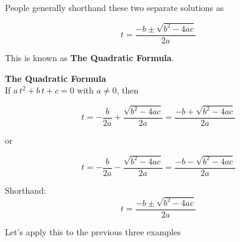 \documentclass{ximera}
\begin{document}
People generally shorthand these two separate solutions as



\[ t  =   \frac{-b \pm \sqrt{b^2 - 4 a c}}{2a}      \]


This is known as \textbf{The Quadratic Formula}.




\begin{definition} \textbf{\textcolor{green!50!black}{The Quadratic Formula}} \\



If $a \, t^2 + b \, t + c = 0$ with $a \ne 0$, then


\[ t   = - \frac{b}{2 a} + \frac{\sqrt{b^2 - 4 a c}}{2a}  = \frac{-b + \sqrt{b^2 - 4 a c}}{2a}      \]

or

\[ t  = - \frac{b}{2 a}  -\frac{\sqrt{b^2 - 4 a c}}{2a} =    \frac{-b - \sqrt{b^2 - 4 a c}}{2a}      \]



Shorthand: 
\[ t  =   \frac{-b \pm \sqrt{b^2 - 4 a c}}{2a}      \]


\end{definition}









Let's apply this to the previous three examples
\end{document}
